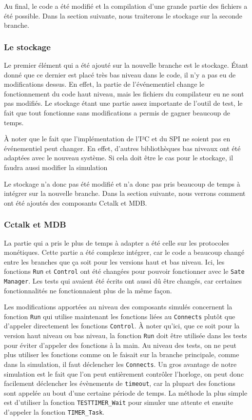\documentclass[a4paper]{article}
\begin{document}
Au final, le code a été modifié et la compilation d'une grande partie des
fichiers a été possible. Dans la section suivante, nous traiterons le stockage sur
la seconde branche.

\subsubsection*{Le stockage}

Le premier élément qui a été ajouté sur la nouvelle branche est le stockage.
Étant donné que ce dernier est placé très bas niveau dans le code, il n'y a pas
eu de modifications dessus. En effet, la partie de l'événementiel change le
fonctionnement du code haut niveau, mais les fichiers du compilateur eu ne sont
pas modifiés. Le stockage étant une partie assez importante de l'outil de test,
le fait que tout fonctionne sans modifications a permis de gagner beaucoup de
temps.

À noter que le fait que l'implémentation de l'I²C et du SPI ne soient pas en
événementiel peut changer. En effet, d'autres bibliothèques bas niveaux ont
été adaptées avec le nouveau système. Si cela doit être le cas pour le stockage,
il faudra aussi modifier la simulation

Le stockage n'a donc pas été modifié et n'a donc pas pris beaucoup de temps à
intégrer sur la nouvelle branche. Dans la section suivante, nous verrons comment
ont été ajoutés des composants Cctalk et MDB.

\subsubsection*{Cctalk et MDB}

La partie qui a pris le plus de temps à adapter a été celle sur les protocoles
monétiques. Cette partie a été complexe intégrer, car le code a beaucoup changé
entre les branches que ça soit pour les versions haut et bas niveau. Ici, les
fonctions \verb|Run| et \verb|Control| ont été changées pour pouvoir fonctionner
avec le \verb|Sate Manager|. Les tests qui avaient été écrits ont aussi dû être
changés, car certaines fonctionnalités ne fonctionnaient plus de la même façon.

Les modifications apportées au niveau des composants simulés concernent la
fonction \verb|Run| qui utilise maintenant les fonctions liées au \verb|Connects|
plutôt que d'appeler directement les fonctions \verb|Control|. À noter qu'ici,
que ce soit pour la version haut niveau ou bas niveau, la fonction \verb|Run|
doit être utilisée dans les tests pour éviter d'appeler des fonctions à la main.
Au niveau des tests, on ne peut plus utiliser les fonctions comme on le faisait
sur la branche principale, comme dans la simulation, il faut déclencher les
\verb|Connects|. Un gros avantage de notre simulation est le fait que l'on peut
entièrement contrôler l'horloge, on peut donc facilement déclencher les
évènements de \verb|timeout|, car la plupart des fonctions sont appelée au bout
d'une certaine période de temps. La méthode la plus simple est d'utiliser la
fonction \verb|TESTTIMER_Wait| pour simuler une attente et ensuite d'appeler la
fonction \verb|TIMER_Task|.
\end{document}

